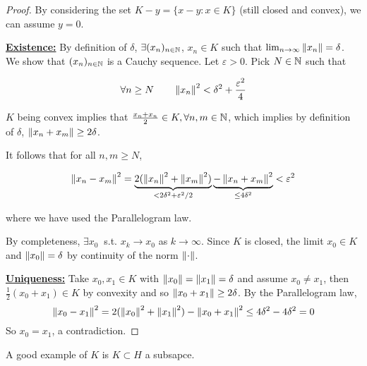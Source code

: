 \documentclass{article}
\begin{document}
\begin{proof} 
By considering the set $K-y = \{x-y: x\in K\}$ (still closed and convex), we can assume $y=0$.  

\underline{\textbf{Existence:}}
By definition of $\delta$, $\exists (x_n)_{n \in \mathbb{N}}$, $x_n\in K$ such that $\lim_{n \to \infty} \left\|{x_n}\right\|=\delta$. We show that $(x_n)_{n \in \mathbb{N}}$ is a Cauchy sequence. Let $\varepsilon >0$. Pick $N \in \mathbb{N}$ such that  

$$
\forall n \geq N \qquad \left\|{x_n}\right\|^2 < \delta^2 + \frac{\varepsilon^2}{4}
$$  

$K$ being convex implies that $\frac{x_n+x_n}{2} \in K, \forall n,m \in \mathbb{N}$, which implies by definition of $\delta$, $\left\|{x_n+x_m}\right\| \geq 2\delta$.  

It follows that for all $n,m \geq N$,  

\begin{equation*}
    \left\|{x_n-x_m}\right\|^2 = \underbrace{2(\left\|{x_n}\right\|^2+\left\|{x_m}\right\|^2)}_{< 2\delta^2 + \varepsilon^2 /2} \underbrace{-\left\|{x_n+x_m}\right\|^2}_{\leq 4\delta^2} < \varepsilon^2
\end{equation*}  

where we have used the Parallelogram law.  

By completeness, $\exists x_0 \ $ s.t. $x_k \to x_0$ as $k \to \infty$. Since $K$ is closed, the limit $x_0\in K$ and $\left\|{x_0}\right\|=\delta$ by continuity of the norm $\left\|{\cdot}\right\|$.  

\underline{\textbf{Uniqueness:}}
Take $x_0, x_1 \in K$ with $\left\|{x_0}\right\|=\left\|{x_1}\right\|=\delta$ and assume $x_0\neq x_1$, then $\frac{1}{2}(x_0+x_1) \in K$ by convexity and so $\left\|{x_0+x_1}\right\|\geq 2\delta$. By the Parallelogram law,  
$$
\left\|{x_0-x_1}\right\|^2 = 2(\left\|{x_0}\right\|^2 + \left\|{x_1}\right\|^2) - \left\|{x_0+x_1}\right\|^2 \leq 4\delta^2-4\delta^2= 0
$$  
So $x_0=x_1$, a contradiction.
\end{proof}  

\begin{remark}
    A good example of $K$ is $K \subset H$ a subsapce.
\end{remark}  
\end{document}

